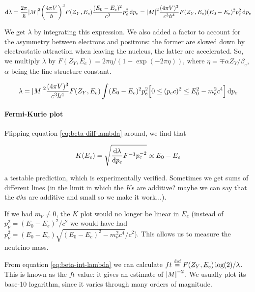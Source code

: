 \documentclass{article}
\begin{document}
\begin{equation} \label{eq:beta-diff-lambda}
    \dd{\lambda}
    = \frac{2 \pi}{\hbar} \abs{M}^2  \qty(\frac{4 \pi V}{h})^3 F(Z_Y, E_e) \frac{(E_0 - E_e)^2}{c^3} p^2_e \dd{p_e}
    =  \abs{M}^2  \frac{(4 \pi V)^3}{c^3 h^4} F(Z_Y, E_e) (E_0 - E_e)^2 p^2_e \dd{p_e}
\end{equation}

We get \(\lambda\) by integrating this expression. We also added a factor to account for the asymmetry between electrons and positrons: the former are slowed down by electrostatic attraction when leaving the nucleus, the latter are accelerated. So, we multiply \(\lambda\) by \(F(Z_Y, E_e) = 2 \pi \eta / (1- \exp(-2 \pi \eta ))\), %
where \(\eta = \mp \alpha Z_Y / \beta_e\), \(\alpha\) being the fine-structure constant.

\begin{equation}\label{eq:beta-int-lambda}
    \lambda = \abs{M}^2  \frac{(4 \pi V)^3}{c^3 h^4} F(Z_Y, E_e) \int (E_0 - E_e)^2 p^2_e \qty[0 \leq (p_e c)^2 \leq E_0^2 - m_e^2 c^4] \dd{p_e}
\end{equation}

\paragraph{Fermi-Kurie plot}

Flipping equation \eqref{eq:beta-diff-lambda} around, we find that

\begin{equation}
    K(E_e) = \sqrt{ \dv{\lambda}{p_e} F^{-1} p_e^{-2} } \propto E_0 - E_e
\end{equation}

a testable prediction, which is experimentally verified. Sometimes we get sums of different lines (in the limit in which the \(K\)s are additive? maybe we can say that the \(\dd{\lambda} \)s are additive and small so we make it work...).

If we had \(m_\nu \neq 0\), the \(K\) plot would no longer be linear in \(E_e\) (instead of \(p_\nu^2 = (E_0 - E_e)^2/c^2\) we would have had \(p_\nu^2 = (E_0 - E_e) \sqrt{(E_0-E_e)^2 - m_\nu ^2 c^4} /c^2\)). This allows us to measure the neutrino mass.

From equation \eqref{eq:beta-int-lambda} we can calculate \(ft \stackrel{\text{def}}{=} F(Z_Y, E_e) \log(2) / \lambda \). This is known as the \(ft\) value: it gives an estimate of \(\abs{M}^{-2} \). We usually plot its base-10 logarithm, since it varies through many orders of magnitude.
\end{document}
